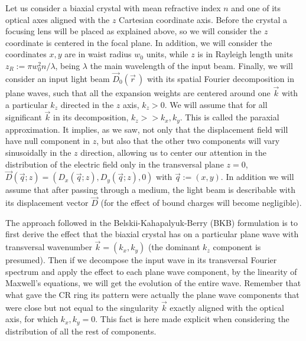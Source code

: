 \documentclass[11pt, a4paper, twoside]{article} %
\begin{document}
Let us consider a biaxial crystal with mean refractive index $n$ and one of its optical axes aligned with the $z$ Cartesian coordinate axis. Before the crystal a focusing lens will be placed as explained above, so we will consider the $z$ coordinate is centered in the focal plane. In addition, we will consider the coordinates $x,y$ are in waist radius $w_0$ units, while $z$ is in Rayleigh length units $z_R:=\pi w_0^2n/\lambda$, being $\lambda$ the main wavelength of the input beam. Finally, we will consider an input light beam $\vec{D}_0(\vec{r}\,)$ with its spatial Fourier decomposition in plane waves, such that all the expansion weights are centered around one $\vec{k}$ with a particular $k_z$ directed in the $z$ axis, $k_z>0$. We will assume that for all significant $\vec{k}$ in its decomposition, $k_z>>k_x,k_y$. This is called the paraxial approximation. It implies, as we saw, not only that the displacement field will have null component in $z$, but also that the other two components will vary sinusoidally in the $z$ direction, allowing us to center our attention in the distribution of the electric field only in the transversal plane $z=0$, $\vec{D}(\vec{q};z)=(D_x(\vec{q};z),D_y(\vec{q};z), 0)$ with $\vec{q}:=(x,y)$. In addition we will assume that after passing through a medium, the light beam is describable with its displacement vector $\vec{D}$ (for the effect of bound charges will become negligible).

The approach followed in the Belskii-Kahapalyuk-Berry (BKB) formulation is to first derive the effect that the biaxial crystal has on a particular plane wave with transversal wavenumber $\vec{k}=(k_x,k_y)$ (the dominant $k_z$ component is presumed). Then if we decompose the input wave in its transversal Fourier spectrum and apply the effect to each plane wave component, by the linearity of Maxwell's equations, we will get the evolution of the entire wave. Remember that what gave the CR ring its pattern were actually the plane wave components that were close but not equal to the singularity $\vec{k}$ exactly aligned with the optical axis, for which $k_x,k_y=0$. This fact is here made explicit when considering the distribution of all the rest of components.
\end{document}
